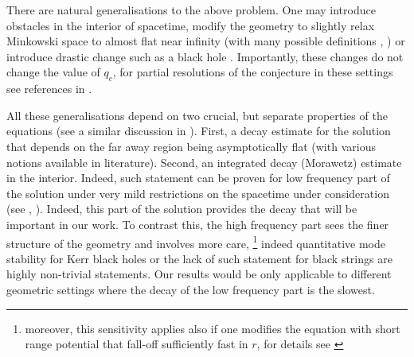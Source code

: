 \documentclass[11pt, oneside]{amsart}
\begin{document}
	There are natural generalisations to the above problem. One may introduce obstacles in the interior of spacetime, modify the geometry to slightly relax Minkowski space to almost flat near infinity (with many possible definitions \cite{baskin_asymptotics_2018}, \cite{sogge_concerning_2010}) or introduce drastic change such as a black hole \cite{lindblad_strauss_2014}. Importantly, these changes do not change the value of $q_c$, for partial resolutions of the conjecture in these settings see references in \cite{wang_recent_2012}.
	
	\begin{remark}
		All these generalisations depend on two crucial, but separate properties of the equations (see a similar discussion in \cite{lindblad_strauss_2014}). First, a decay estimate for the solution that depends on the far away region being asymptotically flat (with various notions available in literature). Second, an integrated decay (Morawetz) estimate in the interior. Indeed, such statement can be proven for low frequency part of the solution under very mild restrictions on the spacetime under consideration (see \cite{vasy_morawetz_2013}, \cite{moschidis_logarithmic_2016}). Indeed, this part of the solution provides the decay that will be important in our work. To contrast this, the high frequency part sees the finer structure of the geometry and involves more care, \footnote{moreover, this sensitivity applies also if one modifies the equation with short range potential that fall-off sufficiently fast in $r$, for details see \cite{moschidis_rp_2016}} indeed quantitative mode stability for Kerr black holes \cite{shlapentokh-rothman_quantitative_2015} or the lack of such statement for black strings \cite{benomio_stable_2021} are highly non-trivial statements. Our results would be only applicable to different geometric settings where the decay of the low frequency part is the slowest.
	\end{remark}
\end{document}
